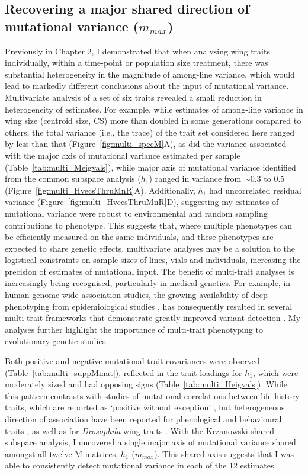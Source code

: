 \subsection{Recovering a major shared direction of mutational variance ($m_{max}$)}
Previously in Chapter 2, I demonstrated that when analysing wing traits individually, within a time-point or population size treatment, there was substantial heterogeneity in the magnitude of among-line variance, which would lead to markedly different conclusions about the input of mutational variance. Multivariate analysis of a set of six traits revealed a small reduction in heterogeneity of estimates. For example, while estimates of among-line variance in wing size (centroid size, CS) more than doubled in some generations compared to others, the total variance (i.e., the trace) of the trait set considered here ranged by less than that (Figure~\ref{fig:multi_specM}A), as did the variance associated with the major axis of mutational variance estimated per sample (Table~\ref{tab:multi_Meigvals}), while major axis of mutational variance identified from the common subspace analysis ($h_1$) ranged in variance from $\sim0.3$ to 0.5 (Figure~\ref{fig:multi_HvecsThruMnR}A). Additionally, $h_1$ had uncorrelated residual variance (Figure~\ref{fig:multi_HvecsThruMnR}D), suggesting my estimates of mutational variance were robust to environmental and random sampling contributions to phenotype. This suggests that, where multiple phenotypes can be efficiently measured on the same individuals, and these phenotypes are expected to share genetic effects, multivariate analyses may be a solution to the logistical constraints on sample sizes of lines, vials and individuals, increasing the precision of estimates of mutational input. The benefit of multi-trait analyses is increasingly being recognised, particularly in medical genetics. For example, in human genome-wide association studies, the growing availability of deep phenotyping from epidemiological studies \citep{Bycr18}, has consequently resulted in several multi-trait frameworks that demonstrate greatly improved variant detection \citep{Qi18, Turl18, Base19, Wu20}. My analyses further highlight the importance of multi-trait phenotyping to evolutionary genetic studies.\par

Both positive and negative mutational trait covariances were observed (Table~\ref{tab:multi_suppMmat}), reflected in the trait loadings for $h_1$, which were moderately sized and had opposing signs (Table~\ref{tab:multi_Heigvals}). While this pattern contrasts with studies of mutational correlations between life-history traits, which are reported as ‘positive without exception’ \citep{Keig00, Este05, Este06}, but heterogeneous direction of association have been reported for phenological \citep{Cama00} and behavioural traits
\citep{Lati14,Mall23}, as well as for \textit{Drosophila} wing traits \citep{Duga21}. With the Krzanowski shared subspace analysis, I uncovered a single major axis of mutational variance shared amongst all twelve M-matrices, $h_1$ ($m_{max}$). This shared axis suggests that I was able to consistently detect mutational variance in each of the 12 estimates. \par

